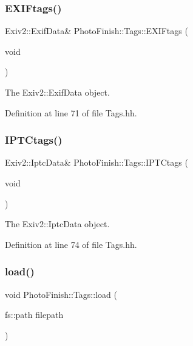 \subsubsection{\texorpdfstring{E\+X\+I\+Ftags()}{EXIFtags()}}
{\footnotesize\ttfamily Exiv2\+::\+Exif\+Data\& Photo\+Finish\+::\+Tags\+::\+E\+X\+I\+Ftags (\begin{DoxyParamCaption}\item[{void}]{ }\end{DoxyParamCaption})\hspace{0.3cm}{\ttfamily [inline]}}



The Exiv2\+::\+Exif\+Data object. 



Definition at line 71 of file Tags.\+hh.

\mbox{\label{class_photo_finish_1_1_tags_aafa729966f296935a69951e094ee7668}} 
\subsubsection{\texorpdfstring{I\+P\+T\+Ctags()}{IPTCtags()}}
{\footnotesize\ttfamily Exiv2\+::\+Iptc\+Data\& Photo\+Finish\+::\+Tags\+::\+I\+P\+T\+Ctags (\begin{DoxyParamCaption}\item[{void}]{ }\end{DoxyParamCaption})\hspace{0.3cm}{\ttfamily [inline]}}



The Exiv2\+::\+Iptc\+Data object. 



Definition at line 74 of file Tags.\+hh.

\mbox{\label{class_photo_finish_1_1_tags_a0587ca696bee570efb8cb799a6126b76}} 
\subsubsection{\texorpdfstring{load()}{load()}}
{\footnotesize\ttfamily void Photo\+Finish\+::\+Tags\+::load (\begin{DoxyParamCaption}\item[{fs\+::path}]{filepath }\end{DoxyParamCaption})}



